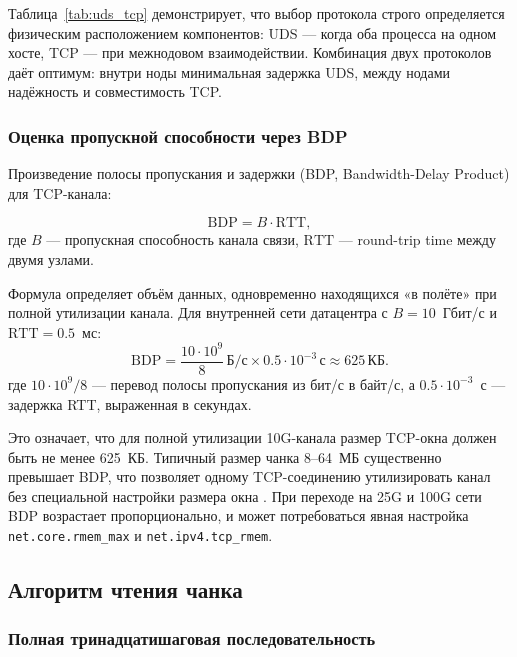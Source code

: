 Таблица~\ref{tab:uds_tcp} демонстрирует, что выбор протокола строго определяется физическим расположением компонентов: UDS --- когда оба процесса на одном хосте, TCP --- при межнодовом взаимодействии. Комбинация двух протоколов даёт оптимум: внутри ноды минимальная задержка UDS, между нодами надёжность и совместимость TCP.

\subsubsection{Оценка пропускной способности через BDP}

Произведение полосы пропускания и задержки (BDP, Bandwidth-Delay Product) для TCP-канала:

\begin{equation}
\mathrm{BDP} = B \cdot \mathrm{RTT},
\label{eq:bdp}
\end{equation}
где $B$ --- пропускная способность канала связи, $\mathrm{RTT}$ --- round-trip time между двумя узлами.

Формула определяет объём данных, одновременно находящихся «в полёте» при полной утилизации канала. Для внутренней сети датацентра с $B = 10$~Гбит/с и $\mathrm{RTT} = 0.5$~мс:
\begin{equation}
\mathrm{BDP} = \frac{10 \cdot 10^9}{8}\,\text{Б/с} \times 0.5 \cdot 10^{-3}\,\text{с} \approx 625\,\text{КБ}.
\end{equation}
где $10 \cdot 10^9 / 8$ --- перевод полосы пропускания из бит/с в байт/с, а $0.5 \cdot 10^{-3}$~с --- задержка RTT, выраженная в секундах.

Это означает, что для полной утилизации 10G-канала размер TCP-окна должен быть не менее 625~КБ. Типичный размер чанка 8--64~МБ существенно превышает BDP, что позволяет одному TCP-соединению утилизировать канал без специальной настройки размера окна \cite{hennessy2011ca}. При переходе на 25G и 100G сети BDP возрастает пропорционально, и может потребоваться явная настройка \texttt{net.core.rmem\_max} и \texttt{net.ipv4.tcp\_rmem}.

\subsection{Алгоритм чтения чанка}

\subsubsection{Полная тринадцатишаговая последовательность}

